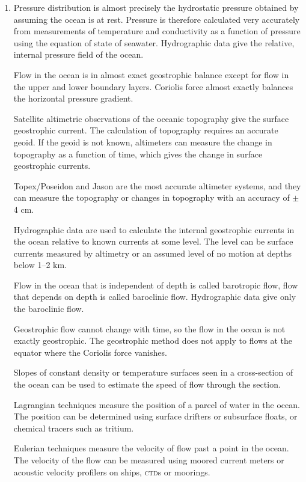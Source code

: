 \begin{enumerate}

\item
Pressure distribution is almost precisely the hydrostatic pressure obtained
by assuming the ocean is at rest. Pressure is therefore calculated very
accurately from measurements of temperature and conductivity as a function of
pressure using the equation of state of seawater. Hydrographic data give the relative, internal pressure field of the ocean.

\vitem
Flow in the ocean is in almost exact geostrophic balance
except for flow in the upper and lower boundary layers. Coriolis force  almost exactly balances the horizontal pressure gradient.

\vitem
Satellite altimetric observations of the oceanic topography give the
surface geostrophic current. The calculation
of topography requires an accurate geoid. If the geoid is not known, altimeters can measure the change in topography as a function of time, which gives the change in surface geostrophic currents.

\vitem
Topex/Poseidon and Jason are the most accurate
altimeter systems, and they can measure the topography
or changes in topography with an accuracy of
$\pm$4 cm.

\vitem 
Hydrographic data are used to
calculate the internal geostrophic currents in the ocean relative to known currents at some level. The level can be surface
currents measured by altimetry or an assumed level of no motion at depths below 1--2 km.

\vitem
Flow in the ocean that is independent of depth is called barotropic flow,
flow that depends on depth is called baroclinic flow. Hydrographic data give only the baroclinic flow.

\vitem Geostrophic flow cannot change with time, so the flow in the ocean is not
exactly geostrophic. The geostrophic method does not apply to flows at the
equator where the Coriolis force vanishes.

\vitem Slopes of constant density or temperature surfaces seen in a
cross-section of the ocean can be used to estimate the speed of flow through the
section.

\vitem Lagrangian techniques measure the position of a parcel of water in the
ocean. The position can be determined using surface drifters or subsurface
floats, or chemical tracers such as tritium.

\vitem Eulerian techniques measure the velocity of flow past a point in the ocean.
The velocity of the flow can be measured using moored current meters or acoustic
velocity profilers on ships, \textsc{ctd}s or moorings.
\end{enumerate}


